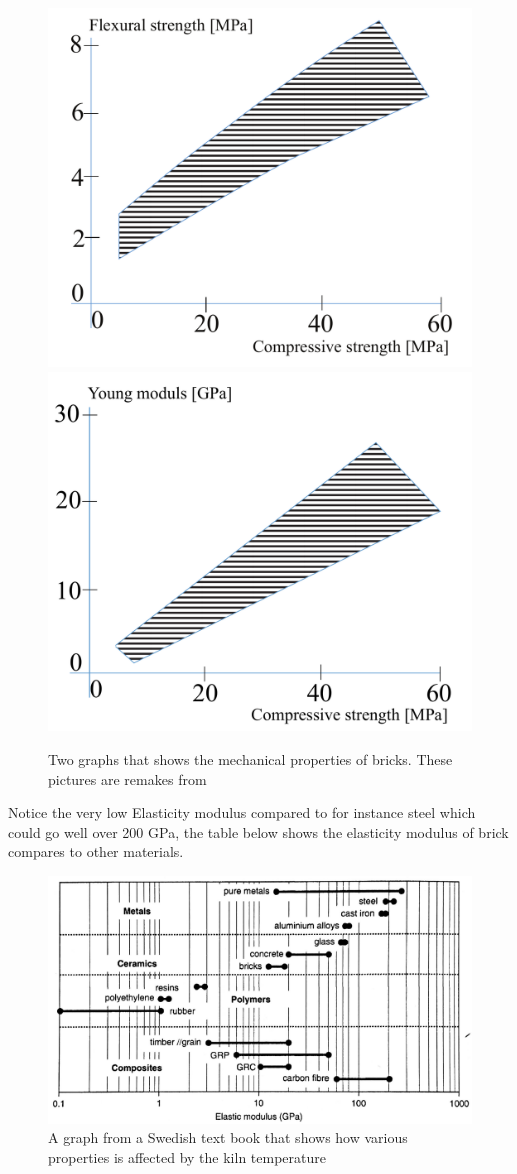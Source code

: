 \begin{figure}[H]
\centering
\includegraphics[width=0.49\linewidth ]{figure/Introduction/BrickProp1.pdf}
\includegraphics[width=0.49\linewidth ]{figure/Introduction/BrickProp2.pdf}
\caption{Two graphs that shows the mechanical properties of bricks. These pictures are remakes from\cite{ref:byggmaterial} }
\end{figure}

Notice the very low Elasticity modulus compared to for instance steel which could go well over 200 GPa, the table below shows the elasticity modulus of brick compares to other materials.

\begin{figure}[H]
\centering
\includegraphics[width=0.9\linewidth ]{figure/Introduction/elastictymodulus.pdf}
\caption{A graph from a Swedish text book \cite{ref:byggmaterial} that shows how various properties is affected by the kiln temperature}
\end{figure}


